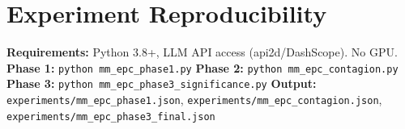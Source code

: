 \documentclass[11pt,a4paper]{article}
\begin{document}
\appendix
\section{Experiment Reproducibility}
\textbf{Requirements:} Python 3.8+, LLM API access (api2d/DashScope). No GPU.
\textbf{Phase 1:} \texttt{python mm\_epc\_phase1.py}
\textbf{Phase 2:} \texttt{python mm\_epc\_contagion.py}
\textbf{Phase 3:} \texttt{python mm\_epc\_phase3\_significance.py}
\textbf{Output:} \texttt{experiments/mm\_epc\_phase1.json}, \texttt{experiments/mm\_epc\_contagion.json}, \texttt{experiments/mm\_epc\_phase3\_final.json}
\end{document}
